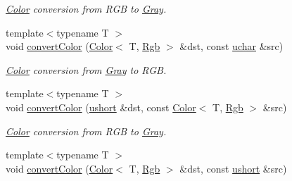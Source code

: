 \begin{DoxyCompactItemize}
\begin{DoxyCompactList}\small\item\em \hyperlink{class_d_o_1_1_color}{Color} conversion from R\-G\-B to \hyperlink{struct_d_o_1_1_gray}{Gray}. \end{DoxyCompactList}\item 
\hypertarget{group___color_conversion_gafc8d94b34860d29067fe9b242c900f6b}{{\footnotesize template$<$typename T $>$ }\\void \hyperlink{group___color_conversion_gafc8d94b34860d29067fe9b242c900f6b}{convert\-Color} (\hyperlink{class_d_o_1_1_color}{Color}$<$ T, \hyperlink{group___color_space_gaad92fea51e98e11252ac86f2c8665d13}{Rgb} $>$ \&dst, const \hyperlink{group___eigen_typedefs_ga65f85814a8290f9797005d3b28e7e5fc}{uchar} \&src)}\label{group___color_conversion_gafc8d94b34860d29067fe9b242c900f6b}

\begin{DoxyCompactList}\small\item\em \hyperlink{class_d_o_1_1_color}{Color} conversion from \hyperlink{struct_d_o_1_1_gray}{Gray} to R\-G\-B. \end{DoxyCompactList}\item 
\hypertarget{group___color_conversion_gaab2e1b8480e491b35c672164f52065a1}{{\footnotesize template$<$typename T $>$ }\\void \hyperlink{group___color_conversion_gaab2e1b8480e491b35c672164f52065a1}{convert\-Color} (\hyperlink{group___eigen_typedefs_gab95f123a6c9bcfee6a343170ef8c5f69}{ushort} \&dst, const \hyperlink{class_d_o_1_1_color}{Color}$<$ T, \hyperlink{group___color_space_gaad92fea51e98e11252ac86f2c8665d13}{Rgb} $>$ \&src)}\label{group___color_conversion_gaab2e1b8480e491b35c672164f52065a1}

\begin{DoxyCompactList}\small\item\em \hyperlink{class_d_o_1_1_color}{Color} conversion from R\-G\-B to \hyperlink{struct_d_o_1_1_gray}{Gray}. \end{DoxyCompactList}\item 
\hypertarget{group___color_conversion_ga51ae8a0b4207c11c6e21329dba4f6777}{{\footnotesize template$<$typename T $>$ }\\void \hyperlink{group___color_conversion_ga51ae8a0b4207c11c6e21329dba4f6777}{convert\-Color} (\hyperlink{class_d_o_1_1_color}{Color}$<$ T, \hyperlink{group___color_space_gaad92fea51e98e11252ac86f2c8665d13}{Rgb} $>$ \&dst, const \hyperlink{group___eigen_typedefs_gab95f123a6c9bcfee6a343170ef8c5f69}{ushort} \&src)}\label{group___color_conversion_ga51ae8a0b4207c11c6e21329dba4f6777}


\end{DoxyCompactItemize}
